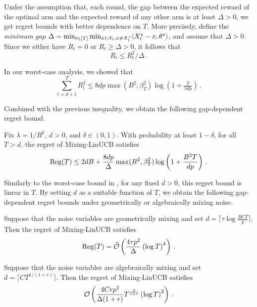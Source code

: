 Under the assumption that, each round, the gap between the expected reward of the optimal arm and the expected reward of any other arm is at least $\Delta > 0$, we get regret bounds with better dependence on $T$. More precisely, define the \emph{minimum gap} $\Delta = \min_{t \in [T]}\min_{x \in \mathcal{X}_t, x \neq X_t^{\star}}\langle X_t^{\star} - x,\theta^{\star}\rangle$, and assume that $\Delta > 0$. Since we either have $R_t = 0$ or $R_t \geq \Delta > 0$, it follows that
\begin{equation*}
R_t \leq R_t^2/\Delta\,.
\end{equation*}

In our worst-case analysis, we showed that
\begin{equation*}
\sum_{t=d+1}^{T}R_t^2 \leq 8dp\max(B^2, \beta_T^2)\log(1 + \tfrac{T}{\lambda dp})\,.
\end{equation*}

Combined with the previous inequality, we obtain the following gap-dependent regret bound.

\begin{theorem}
Fix $\lambda = 1/B^2$, $d>0$, and $\delta\in(0,1)$. With probability at least $1 - \delta$, for all $T > d$, the regret of Mixing-LinUCB satisfies
\begin{align*}
\mathrm{Reg}(T) \leq 2dB + \frac{8dp}{\Delta}\max(B^2, \beta_{T}^2)\log\left(1 + \frac{B^2T}{dp}\right)\,.
\end{align*}
\label{thm:gap_reg}
\end{theorem}

Similarly to the worst-case bound in , for any fixed $d > 0$, this regret bound is linear in $T$. By setting $d$ as a suitable function of $T$, we obtain the following gap-dependent regret bounds under geometrically or algebraically mixing noise. 

\begin{corollary}
\label{cor2:geometric_mixing}
Suppose that the noise variables are geometrically mixing and set $d = \lceil \tau\log\tfrac{BCT}{p}\rceil$. Then the regret of Mixing-LinUCB satisfies
\begin{align*}
\mathrm{Reg}(T) = \widetilde{\mathcal{O}}\left(\frac{4\tau p^2}{\Delta}\left(\log T\right)^4\right)\,.
\end{align*}
\label{cor:gap_reg_geo}
\end{corollary}

\begin{corollary}
\label{cor2:algebraic_mixing}
Suppose that the noise variables are algebraically mixing and set $d=\lceil CT^{1/(1+r)}\rceil$. Then the regret of Mixing-LinUCB satisfies
\begin{equation*}
\mathcal{O}\left( \frac{4Crp^2}{\Delta(1+r)}T^{\frac{2}{1+r}}\left(\log T\right)^2\right)\,.
\end{equation*}
\label{cor:gap_reg_alg}
\end{corollary}

